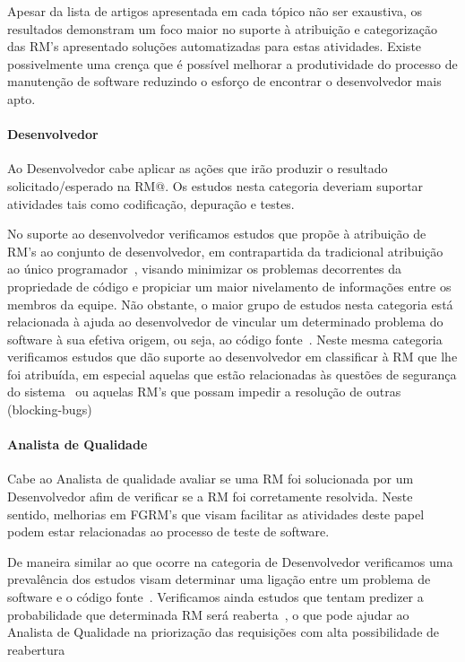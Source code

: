 Apesar da lista de artigos apresentada em cada tópico não ser exaustiva, os
resultados demonstram um foco maior no suporte à atribuição e categorização das
RM's apresentado soluções automatizadas para estas atividades. Existe
possivelmente uma crença que é possível melhorar a produtividade do processo de
manutenção de software reduzindo o esforço de encontrar o desenvolvedor mais
apto.

\paragraph{Desenvolvedor} Ao Desenvolvedor cabe aplicar as ações que irão
produzir o resultado solicitado/esperado na RM@. Os estudos nesta categoria
deveriam suportar atividades tais como codificação, depuração e testes. 

No suporte ao desenvolvedor verificamos estudos que propõe à atribuição de RM's
ao conjunto de desenvolvedor, em contrapartida da tradicional atribuição ao
único programador~\cite{banitaan2013decoba}, visando  minimizar os pro\-ble\-mas
decorrentes da propriedade de código e propiciar um maior nivelamento de
informações entre os membros da equipe. Não obstante, o maior grupo de estudos
nesta categoria está relacionada à ajuda ao desenvolvedor de vincular um
determinado problema do software à sua efetiva origem, ou seja, ao código
fonte~\cite{corley2011recovering,Wong:2014:BBF:2705615.2706096,
	Thung:2014:BIT:2635868.2661678,Nguyen:2012:MAR:2393596.2393671,thung2013automatic,
	Romo:2015:TAT:2745802.2745833}. Neste mesma categoria verificamos estudos
que dão suporte ao desenvolvedor em classificar à RM que lhe foi atribuída, em
especial aquelas que estão relacionadas às questões de segurança do
sistema~\cite{gegick2010identifying} ou aquelas RM's que possam impedir a
resolução de outras
(blocking-bugs)~\cite{ValdiviaGarcia:2014:CPB:2597073.2597099}

\paragraph{Analista de Qualidade} Cabe ao Analista de qualidade avaliar se uma
RM foi solucionada por um Desenvolvedor afim de verificar se a RM foi
corretamente resolvida. Neste sentido, melhorias em FGRM's que visam facilitar
as atividades deste papel podem estar relacionadas ao processo de teste de
software.

De maneira similar ao que ocorre na categoria de Desenvolvedor verificamos uma
prevalência dos estudos visam determinar uma ligação entre um problema de
software e o código
fonte~\cite{corley2011recovering,Wong:2014:BBF:2705615.2706096,
	Thung:2014:BIT:2635868.2661678,Nguyen:2012:MAR:2393596.2393671,thung2013automatic,
	Romo:2015:TAT:2745802.2745833}. Verificamos ainda estudos que tentam
predizer a probabilidade que determinada RM será
reaberta~\cite{xia2015automatic}, o que pode ajudar ao Analista de Qualidade na
priorização das requisições com alta possibilidade de reabertura

